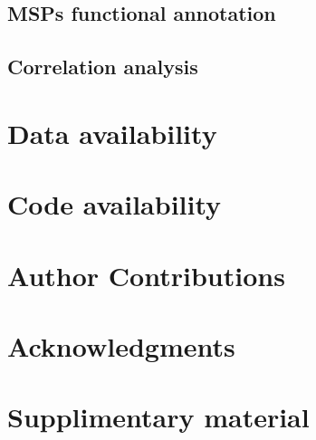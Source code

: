 \documentclass{article}
\begin{document}
\subsection{MSPs functional annotation}

\subsection{Correlation analysis}

\section{Data availability}

\section{Code availability}

\section{Author Contributions}

\section{Acknowledgments}



\section{Supplimentary material}
\end{document}
